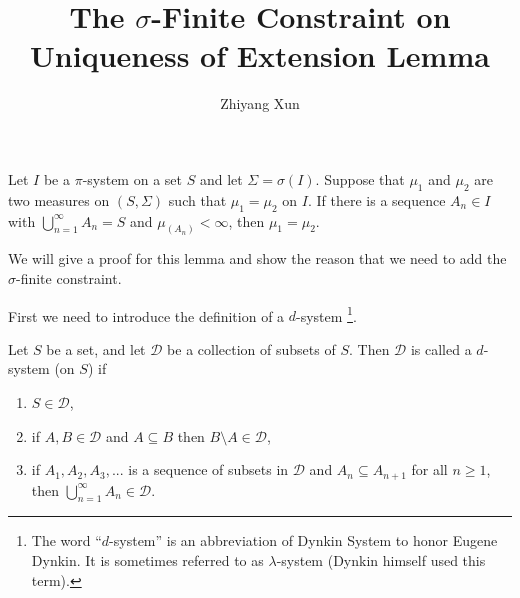 

\newcommand{\D}{\mathcal{D}}
\newcommand{\I}{\mathcal{I}}
\newcommand{\Leb}{\operatorname{Leb}}
\newcommand{\ds}{$d$-system}

\title{The $\sigma$-Finite Constraint on Uniqueness of Extension Lemma}
\author{Zhiyang Xun}



\maketitle      
\begin{tcolorbox}
    \begin{lemma}
        \label{main}
        Let $I$ be a $\pi$-system on a set $S$ and let $\Sigma = \sigma(I)$.
        Suppose that $\mu_1$ and $\mu_2$ are two measures on $(S, \Sigma)$ such that $\mu_1 =\mu_2$ on $I$. If there is a sequence $A_n \in I$ with $ \bigcup_{n = 1}^{\infty} A_n = S$ and
        $\mu_(A_n) < \infty$,
        then $\mu_1 = \mu_2$.
    \end{lemma}    
\end{tcolorbox}

We will give a proof for this lemma and show the reason that we need to add the $\sigma$-finite constraint.


First we need to introduce the definition of a $d$-system \footnote{The word ``$d$-system'' is an abbreviation of Dynkin System to honor Eugene Dynkin. It is sometimes referred to as $\lambda$-system (Dynkin himself used this term).}.
\begin{definition}
    Let $S$ be a set, and let $\D$ be a collection of subsets of $S$. Then $\D$ is called a $d$-system (on $S$) if
    \begin{enumerate}[label=(\alph*), topsep=0pt]
        \setlength{\itemsep}{0pt}
        \item $S \in \D$,
        \item if $A, B \in \D$ and $A \subseteq B$ then $B \setminus A \in \D$,
        \item if $A_1, A_2, A_3, ...$ is a sequence of subsets in $\D$ and $A_n \subseteq A_{n+1}$ for all $n \geq 1$, then $ \bigcup _{n=1}^{\infty }A_{n}\in \D$.
    \end{enumerate}
\end{definition}

